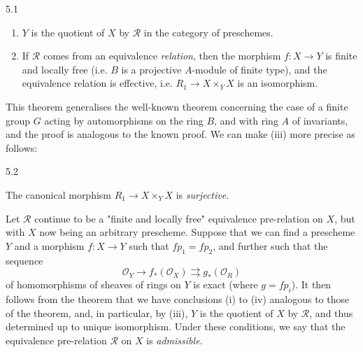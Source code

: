 \begin{theorem}{5.1}
\begin{enumerate}
      
 \item[iii.]
        \(Y\) is the quotient of \(X\) by \(\mathcal {R}\) in the category of preschemes.
      


      
 \item[iv.]
        If \(\mathcal {R}\) comes from an equivalence \emph{relation}, then the morphism \(f\colon  X\to  Y\) is finite and locally free (i.e. \(B\) is a projective \(A\)-module of finite type), and the equivalence relation is effective, i.e. \(R_1\to  X\times _Y X\) is an isomorphism.
      

    \end{enumerate}\end{theorem}\par{}This theorem generalises the well-known theorem concerning the case of a finite group \(G\) acting by automorphisms on the ring \(B\), and with ring \(A\) of invariants, and the proof is analogous to the known proof.
  We can make (iii) more precise as follows:\begin{corollary}{5.2}\label{fga3.iii-5-corollary-5.2}\skipsinglepar\par{}The canonical morphism \(R_1\to  X\times _Y X\) is \emph{surjective}.\end{corollary}\par{}Let \(\mathcal {R}\) continue to be a "finite and locally free" equivalence pre-relation on \(X\), but with \(X\) now being an arbitrary prescheme.
  Suppose that we can find a prescheme \(Y\) and a morphism \(f\colon  X\to  Y\) such that \(fp_1=fp_2\), and further such that the sequence
  \[     \mathcal {O}_Y \to  f_*(\mathcal {O}_X) \rightrightarrows  g_*(\mathcal {O}_R)   \]
  of homomorphisms of sheaves of rings on \(Y\) is exact (where \(g=fp_i\)).
  It then follows from the theorem that we have conclusions (i) to (iv) analogous to those of the theorem, and, in particular, by (iii), \(Y\) is the quotient of \(X\) by \(\mathcal {R}\), and thus determined up to unique isomorphism.
  Under these conditions, we say that the equivalence pre-relation \(\mathcal {R}\) on \(X\) is \emph{admissible}.
